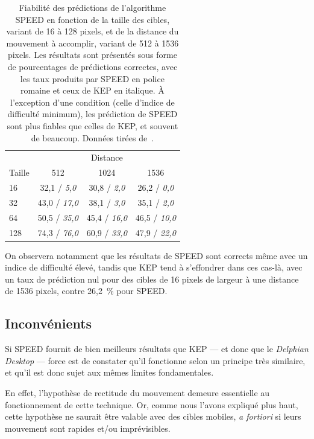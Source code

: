	\begin{table}
	\centering
	\begin{tabular}{l | c c c}
				& \multicolumn{3}{c}{Distance}	\\
		Taille	& 512					& 1024					& 1536					\bigstrut[b] \\ \hline
		16		& 32,1 / \emph{5,0}		& 30,8 / \emph{2,0}		& 26,2 / \emph{0,0}		\bigstrut[t] \\
		32		& 43,0 / \emph{17,0}	& 38,1 / \emph{3,0}		& 35,1 / \emph{2,0}		\\
		64		& 50,5 / \emph{35,0}	& 45,4 / \emph{16,0}	& 46,5 / \emph{10,0}	\\
		128		& 74,3 / \emph{76,0}	& 60,9 / \emph{33,0}	& 47,9 / \emph{22,0}	\\
	\end{tabular}
	\caption[SPEED --- Performances comparées à celles de KEP]{Fiabilité des prédictions de l'algorithme SPEED en fonction de la taille des cibles, variant de 16 à 128 pixels, et de la distance du mouvement à accomplir, variant de 512 à 1536 pixels. Les résultats sont présentés sous forme de pourcentages de prédictions correctes, avec les taux produits par SPEED en police romaine et ceux de KEP en italique. À l'exception d'une condition (celle d'indice de difficulté minimum), les prédiction de SPEED sont plus fiables que celles de KEP, et souvent de beaucoup. Données tirées de~\cite{wonner2011speed}.}
	\label{tab:speedingPastKep}
	\end{table}
	
	On observera notamment que les résultats de SPEED sont corrects même avec un indice de difficulté élevé, tandis que KEP tend à s'effondrer dans ces cas-là, avec un taux de prédiction nul pour des cibles de 16 pixels de largeur à une distance de 1536 pixels, contre 26,2~\%{} pour SPEED.
			
	\subsection{Inconvénients}
	Si SPEED fournit de bien meilleurs résultats que KEP --- et donc que le \emph{Delphian Desktop} --- force est de constater qu'il fonctionne selon un principe très similaire, et qu'il est donc sujet aux mêmes limites fondamentales.
	
	En effet, l'hypothèse de rectitude du mouvement demeure essentielle au fonctionnement de cette technique. Or, comme nous l'avons expliqué plus haut, cette hypothèse ne saurait être valable avec des cibles mobiles, \emph{a fortiori} si leurs mouvement sont rapides et/ou imprévisibles.
	
